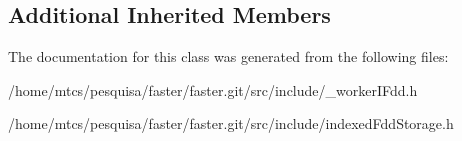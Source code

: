 \subsection*{Additional Inherited Members}


The documentation for this class was generated from the following files\+:\begin{DoxyCompactItemize}
\item 
/home/mtcs/pesquisa/faster/faster.\+git/src/include/\+\_\+worker\+I\+Fdd.\+h\item 
/home/mtcs/pesquisa/faster/faster.\+git/src/include/indexed\+Fdd\+Storage.\+h\end{DoxyCompactItemize}
